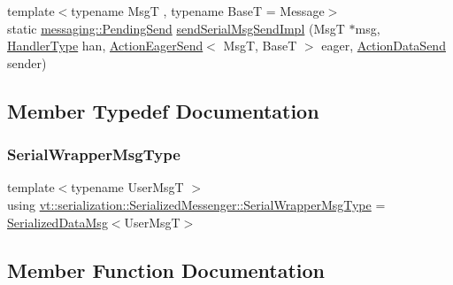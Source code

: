 \begin{DoxyCompactItemize}
\item 
{\footnotesize template$<$typename MsgT , typename BaseT  = Message$>$ }\\static \hyperlink{structvt_1_1messaging_1_1_pending_send}{messaging\+::\+Pending\+Send} \hyperlink{structvt_1_1serialization_1_1_serialized_messenger_abf1608ea281ed8c48f521ac1e90d9969}{send\+Serial\+Msg\+Send\+Impl} (MsgT $\ast$msg, \hyperlink{namespacevt_af64846b57dfcaf104da3ef6967917573}{Handler\+Type} han, \hyperlink{namespacevt_1_1serialization_a009aa1de8d42a3c97643b947fcc6f0b6}{Action\+Eager\+Send}$<$ MsgT, BaseT $>$ eager, \hyperlink{namespacevt_1_1serialization_afffcac0da80b78e77ef8043dba4e814f}{Action\+Data\+Send} sender)
\end{DoxyCompactItemize}


\subsection{Member Typedef Documentation}
\mbox{\label{structvt_1_1serialization_1_1_serialized_messenger_a279027d1664b42cf7f288dc3fc9c3014}} 
\subsubsection{\texorpdfstring{Serial\+Wrapper\+Msg\+Type}{SerialWrapperMsgType}}
{\footnotesize\ttfamily template$<$typename User\+MsgT $>$ \\
using \hyperlink{structvt_1_1serialization_1_1_serialized_messenger_a279027d1664b42cf7f288dc3fc9c3014}{vt\+::serialization\+::\+Serialized\+Messenger\+::\+Serial\+Wrapper\+Msg\+Type} =  \hyperlink{namespacevt_1_1serialization_a56d2aee859dc963c2b5fad82649dd79a}{Serialized\+Data\+Msg}$<$User\+MsgT$>$}



\subsection{Member Function Documentation}
\mbox{\label{structvt_1_1serialization_1_1_serialized_messenger_aa72a9a7c6b1ea78eeccb928c68a4c505}} 

